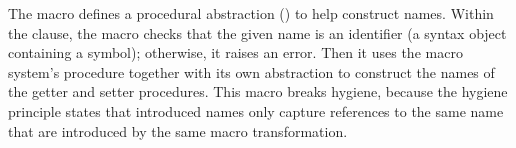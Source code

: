 \begin{schemeregion}
The macro defines a procedural abstraction () to
help construct names. Within the  clause, the
macro checks that the given name is an identifier (a syntax object
containing a symbol); otherwise, it raises an error. Then it uses the
macro system's  procedure together with
its own  abstraction to construct the names of
the getter and setter procedures. This macro breaks hygiene, because
the hygiene principle states that introduced names only capture
references to the same name that are introduced by the same macro
transformation.
\end{schemeregion}



%




